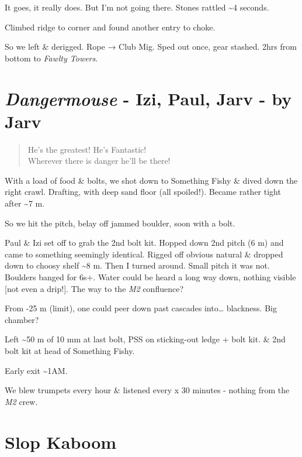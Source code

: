 It goes, it really does. But I'm not going there. Stones rattled
\textasciitilde 4 seconds.

Climbed ridge to corner and found another entry to choke.

So we left \& derigged. Rope → Club Mig. Sped out once, gear stashed.
2hrs from bottom to \emph{Fawlty Towers}.


\hypertarget{dangermouse---izi-paul-jarv---by-jarv}{%
\section{\texorpdfstring{\emph{Dangermouse} - Izi, Paul, Jarv - by
Jarv}{Dangermouse - Izi, Paul, Jarv - by Jarv}}\label{dangermouse---izi-paul-jarv---by-jarv}}

\begin{verse}
He's the greatest! He's Fantastic!\\
Wherever there is danger he'll be there!
\end{verse}

With a load of food \& bolts, we shot down to Something Fishy \& dived
down the right crawl. Drafting, with deep sand floor (all spoiled!).
Became rather tight after \textasciitilde7 m.

So we hit the pitch, belay off jammed boulder, soon with a bolt.

Paul \& Izi set off to grab the 2nd bolt kit. Hopped down 2nd pitch (6
m) and came to something seemingly identical. Rigged off obvious natural
\& dropped down to choosy shelf \textasciitilde8 m. Then I turned
around. Small pitch it was not. Boulders banged for 6s+. Water could be
heard a long way down, nothing visible {[}not even a drip!{]}. The way
to the \emph{M2} confluence?

From -25 m (limit), one could peer down past cascades into\ldots{}
blackness. Big chamber?

Left \textasciitilde50 m of 10 mm at last bolt, PSS on sticking-out
ledge + bolt kit. \& 2nd bolt kit at head of Something Fishy.

Early exit \textasciitilde1AM.

We blew trumpets every hour \& listened every x 30 minutes - nothing
from the \emph{M2} crew.


\hypertarget{slop-kaboom}{%
\section{Slop Kaboom}\label{slop-kaboom}}

